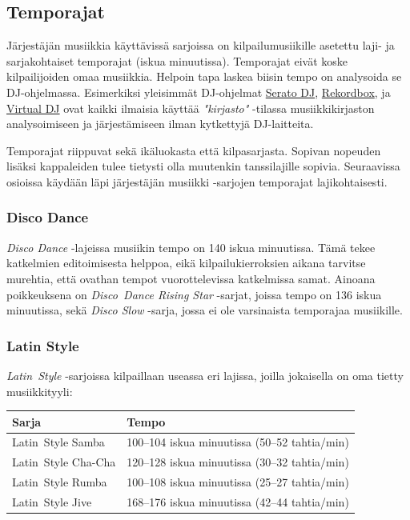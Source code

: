 \documentclass[12pt, a4paper, oneside]{article}
\begin{document}
\subsection{Temporajat}

Järjestäjän musiikkia käyttävissä sarjoissa on kilpailumusiikille asetettu laji- ja sarjakohtaiset temporajat (iskua minuutissa).
Temporajat eivät koske kilpailijoiden omaa musiikkia.
Helpoin tapa laskea biisin tempo on analysoida se DJ-ohjelmassa.
Esimerkiksi yleisimmät DJ-ohjelmat \href{https://serato.com/dj}{Serato DJ},
\href{https://rekordbox.com/}{Rekordbox},
ja \href{https://www.virtualdj.com/}{Virtual DJ}
ovat kaikki ilmaisia käyttää \textit{"kirjasto"} -tilassa musiikkikirjaston analysoimiseen ja järjestämiseen ilman kytkettyjä DJ-laitteita.

Temporajat riippuvat sekä ikäluokasta että kilpasarjasta.
Sopivan nopeuden lisäksi kappaleiden tulee tietysti olla muutenkin tanssilajille sopivia.
Seuraavissa osioissa käydään läpi järjestäjän musiikki -sarjojen temporajat lajikohtaisesti.

\subsubsection{Disco Dance}

\textit{Disco Dance} -lajeissa musiikin tempo on 140 iskua minuutissa.
Tämä tekee katkelmien editoimisesta helppoa,
eikä kilpailukierroksien aikana tarvitse murehtia,
että ovathan tempot vuorottelevissa katkelmissa samat.
Ainoana poikkeuksena on \textit{Disco~Dance Rising Star} -sarjat,
joissa tempo on 136 iskua minuutissa,
sekä \textit{Disco Slow} -sarja,
jossa ei ole varsinaista temporajaa musiikille.

\subsubsection{Latin Style}

\textit{Latin~Style} -sarjoissa kilpaillaan useassa eri lajissa,
joilla jokaisella on oma tietty musiikkityyli: \medskip

\begin{table}[ht]
    \centering
    \setlength\tabcolsep{8mm}
    \renewcommand{\arraystretch}{1.5}
    \begin{tabular}{@{\hspace{0.25cm}}ll@{\hspace{0.25cm}}}
        \toprule
        Sarja               & Tempo                                         \\ \midrule
        Latin~Style Samba   & 100--104 iskua minuutissa (50--52 tahtia/min) \\
        Latin~Style Cha-Cha & 120--128 iskua minuutissa (30--32 tahtia/min) \\
        Latin~Style Rumba   & 100--108 iskua minuutissa (25--27 tahtia/min) \\
        Latin~Style Jive    & 168--176 iskua minuutissa (42--44 tahtia/min) \\ \bottomrule
    \end{tabular}
\end{table}
\end{document}
